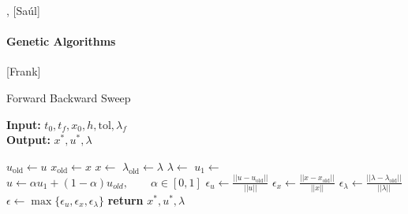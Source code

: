 	\cite*{Pesch1989} , [Saúl]
\paragraph{Genetic Algorithms}
	[Frank]
\begin{algorithm}
	\caption{Forward Backward Sweep } \label{alg:forward_backward_sweep}
    \begin{flushleft}
    	\hspace*{\algorithmicindent} \textbf{Input:} 
    	$t_0, t_f, x_0,h, \text{tol}, \lambda_{f}$ \\
    	\hspace*{\algorithmicindent} \textbf{Output:} 
   		$x^*, u^*, \lambda$
   	\end{flushleft}
	\begin{algorithmic}
				\State $u_{\text{old}} \gets u$ 
                \State $x_{\text{old}} \gets x$ 
                \State $ x \gets$
                \State $\lambda_{\text{old}} \gets \lambda $
				\State $\lambda \gets$ 
                \State $u_1 \gets$ 
                \State 
                	$u \gets \alpha u_1 + (1-\alpha)u_{old}, 
                	\qquad \alpha \in [0, 1]$
                \State 
                	$\epsilon_u \gets \displaystyle 
                	\frac{||u - u_{\text{old}}||}{||u||}$
                \State 
                	$\epsilon_x \gets \displaystyle 
                	\frac{||x - x_{\text{old}}||}{||x||}$
                \State 
                	$\epsilon_{\lambda} \gets \displaystyle 
                	\frac{||\lambda - \lambda_{\text{old}}||}{||\lambda||}$
                \State 
                	$\epsilon \gets 
                		\max{ 
                			\{ \epsilon_u, \epsilon_x, \epsilon_{\lambda} \}
                		}$
      \EndWhile\label{}
        \State \textbf{return} $ x^*, u^*, \lambda$
		\EndProcedure
	\end{algorithmic}
\end{algorithm}

